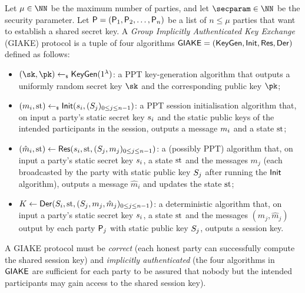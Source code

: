 \begin{plaindef}[GIAKE]\label{def:GKE}
	Let $\mu \in \NN$ be the maximum number of parties, and let $\secparam\in \NN$ be the security parameter. 
	Let $\PartySet = (\User[1],\User[2],\dots,\allowbreak \User[n])$ be a list of $n \leq \mu$ parties that want to establish a shared secret key.
	A \textit{Group Implicitly Authenticated Key Exchange} (GIAKE) protocol is a tuple of four algorithms $\GIAKE = (\KeyGen, \GAKEIni, \GAKERes, \GAKEDer)$ defined as follows:
	\begin{itemize}
		\item $(\sk,\pk) \getsr \KeyGen(1^\secpar)$: a PPT key-generation algorithm that outputs a uniformly random secret key $\sk$ and the corresponding public key $\pk$;
		\item $(m_i,\st) \getsr \GAKEIni (\ssk_i,(\spk_j)_{0\leq j \leq n-1})$: a PPT session initialisation algorithm that, on input a party's static secret key $\ssk_i$ and the static public keys of the intended participants in the session, outputs a message $\messageIni$ and a state $\st$;
		\item $(\hat{m}_i,\st) \gets \GAKERes(\ssk_i,\st,(\spk_j,m_j)_{0\leq j \leq n-1})$: a (possibly PPT) algorithm that, on input a party's static secret key $\ssk_i$, a state $\st$ and the messages $m_j$ (each broadcasted by the party with static public key $\spk_j$ after running the $\GAKEIni$ algorithm), outputs a message $\hat{m}_i$ and updates the state $\st$;
		\item $K \gets \GAKEDer (\spk_i,\st,(\spk_j,m_j,\hat{m}_j)_{0\leq j \leq n-1})$: a deterministic algorithm that,  on input a party's static secret key $\ssk_i$, a state $\st$ and the messages $(m_j,\hat{m}_j)$ output by each party $\User[j]$ with static public key $\spk_j$, outputs a session key.
	\end{itemize}
	A GIAKE protocol must be \textit{correct} (each honest party can successfully compute the shared session key) and \textit{implicitly authenticated} (the four algorithms in $\GIAKE$ are sufficient for each party to be assured that nobody but the intended participants may gain access to the shared session key).
\end{plaindef}
